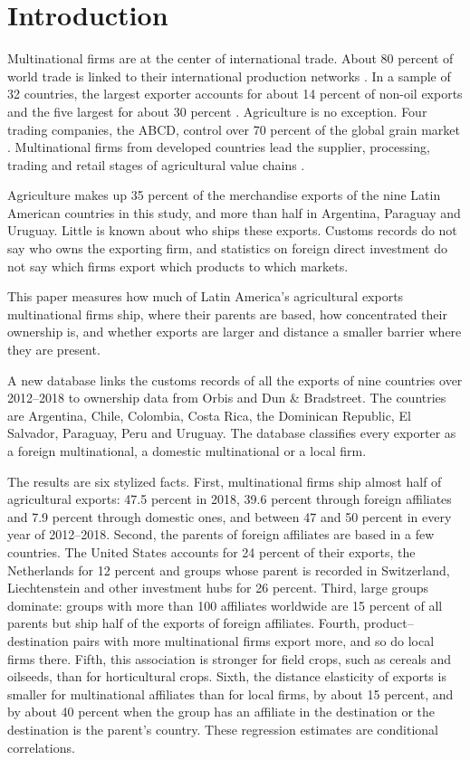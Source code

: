 \section{Introduction}\label{sec:intro}
Multinational firms are at the center of international trade. About 80 percent of world trade is linked to
their international production networks \citep{unctad2013}. In a sample of 32 countries, the largest exporter
accounts for about 14 percent of non-oil exports and the five largest for about 30 percent \citep{freund2015}. Agriculture is no exception. Four trading companies, the ABCD, control over 70 percent of the
global grain market \citep{murphy2012,clapp2015}. Multinational firms from developed countries
lead the supplier, processing, trading and retail stages of agricultural value chains \citep{unctad2009}.

Agriculture makes up 35 percent of the merchandise exports of the nine Latin American countries in this study,
and more than half in Argentina, Paraguay and Uruguay. Little is known about who ships these exports. Customs
records do not say who owns the exporting firm, and statistics on foreign direct investment do not say which firms
export which products to which markets.

This paper measures how much of Latin America's agricultural exports multinational firms ship, where their
parents are based, how concentrated their ownership is, and whether exports are larger and distance a smaller
barrier where they are present.

A new database links the customs records of all the exports of nine countries over 2012--2018 to ownership
data from Orbis and Dun \& Bradstreet. The countries are Argentina, Chile, Colombia, Costa Rica, the
Dominican Republic, El Salvador, Paraguay, Peru and Uruguay. The database classifies every exporter as a foreign
multinational, a domestic multinational or a local firm.

The results are six stylized facts. First, multinational firms ship almost half of agricultural exports: 47.5
percent in 2018, 39.6 percent through foreign affiliates and 7.9 percent through domestic ones, and between 47 and 50
percent in every year of 2012--2018. Second, the parents of foreign affiliates are based in a few countries. The
United States accounts for 24 percent of their exports, the Netherlands for 12 percent and groups whose parent is
recorded in Switzerland, Liechtenstein and other investment hubs for 26 percent. Third, large groups dominate: groups with
more than 100 affiliates worldwide are 15 percent of all parents but ship half of the exports of foreign affiliates.
Fourth, product--destination pairs with more multinational firms export more, and so do local firms there. Fifth, this association is stronger for field crops, such as cereals and oilseeds, than for horticultural
crops. Sixth, the distance elasticity of exports is smaller for multinational affiliates than for local firms, by about 15 percent, and by about 40 percent when the group has an affiliate in the destination or the destination is the parent's country. These regression estimates are conditional correlations.

